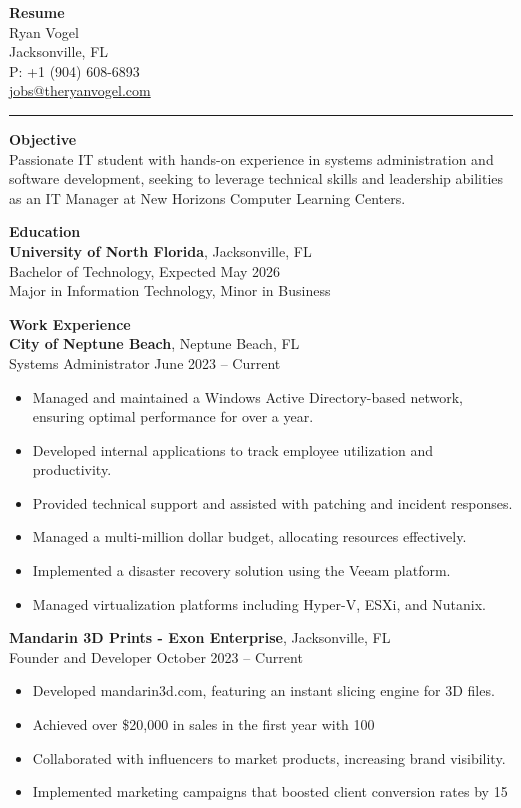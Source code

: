 \documentclass[a4paper,10pt]{article}
\newcommand{\sectiontitle}[1]{
  \vspace{0.4cm}
  \textbf{#1} \\
}
\begin{document}
\begin{center}
  \textbf{\Large Resume} \\
  Ryan Vogel \\ Jacksonville, FL \\
  P: +1 (904) 608-6893 \\
  \href{mailto:jobs@theryanvogel.com}{jobs@theryanvogel.com} \\
\end{center}

\vspace{0.5cm}
\hrule
\vspace{0.4cm}

\sectiontitle{Objective}
Passionate IT student with hands-on experience in systems administration and software development, seeking to leverage technical skills and leadership abilities as an IT Manager at New Horizons Computer Learning Centers.

\sectiontitle{Education}
\textbf{University of North Florida}, Jacksonville, FL \\
Bachelor of Technology, Expected May 2026 \\
Major in Information Technology, Minor in Business

\sectiontitle{Work Experience}
\textbf{City of Neptune Beach}, Neptune Beach, FL \\
Systems Administrator  \hfill June 2023 – Current \\
\begin{itemize}[leftmargin=*]
  \item Managed and maintained a Windows Active Directory-based network, ensuring optimal performance for over a year.
  \item Developed internal applications to track employee utilization and productivity.
  \item Provided technical support and assisted with patching and incident responses.
  \item Managed a multi-million dollar budget, allocating resources effectively.
  \item Implemented a disaster recovery solution using the Veeam platform.
  \item Managed virtualization platforms including Hyper-V, ESXi, and Nutanix.
\end{itemize}

\textbf{Mandarin 3D Prints - Exon Enterprise}, Jacksonville, FL \\
Founder and Developer  \hfill October 2023 – Current \\
\begin{itemize}[leftmargin=*]
  \item Developed mandarin3d.com, featuring an instant slicing engine for 3D files.
  \item Achieved over \$20,000 in sales in the first year with 100%
  \item Collaborated with influencers to market products, increasing brand visibility.
  \item Implemented marketing campaigns that boosted client conversion rates by 15%
\end{itemize}
\end{document}
